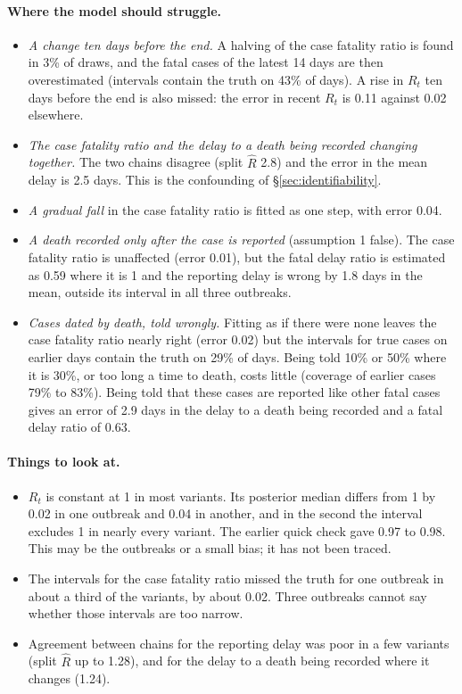 \documentclass[11pt,a4paper]{article}
\begin{document}
\paragraph{Where the model should struggle.}
\begin{itemize}
\item \emph{A change ten days before the end.} A halving of the case
fatality ratio is found in 3\% of draws, and the fatal cases of the latest
14 days are then overestimated (intervals contain the truth on 43\% of
days). A rise in $R_t$ ten days before the end is also missed: the error in
recent $R_t$ is 0.11 against 0.02 elsewhere.
\item \emph{The case fatality ratio and the delay to a death being recorded
changing together.} The two chains disagree (split $\hat R$ 2.8) and the
error in the mean delay is 2.5 days. This is the confounding of
\S\ref{sec:identifiability}.
\item \emph{A gradual fall} in the case fatality ratio is fitted as one
step, with error 0.04.
\item \emph{A death recorded only after the case is reported} (assumption 1
false). The case fatality ratio is unaffected (error 0.01), but the fatal
delay ratio is estimated as 0.59 where it is 1 and the reporting delay is
wrong by 1.8 days in the mean, outside its interval in all three outbreaks.
\item \emph{Cases dated by death, told wrongly.} Fitting as if there were
none leaves the case fatality ratio nearly right (error 0.02) but the
intervals for true cases on earlier days contain the truth on 29\% of
days. Being told 10\% or 50\% where it is 30\%, or too long a time to
death, costs little (coverage of earlier cases 79\% to 83\%). Being told
that these cases are reported like other fatal cases gives an error of 2.9
days in the delay to a death being recorded and a fatal delay ratio of
0.63.
\end{itemize}

\paragraph{Things to look at.}
\begin{itemize}
\item $R_t$ is constant at 1 in most variants. Its posterior median
differs from 1 by 0.02 in one outbreak and 0.04 in another, and in the
second the interval excludes 1 in nearly every variant. The earlier quick
check gave 0.97 to 0.98. This may be the outbreaks or a small bias; it has
not been traced.
\item The intervals for the case fatality ratio missed the truth for one
outbreak in about a third of the variants, by about 0.02. Three outbreaks
cannot say whether those intervals are too narrow.
\item Agreement between chains for the reporting delay was poor in a few
variants (split $\hat R$ up to 1.28), and for the delay to a death being
recorded where it changes (1.24).
\end{itemize}
\end{document}
